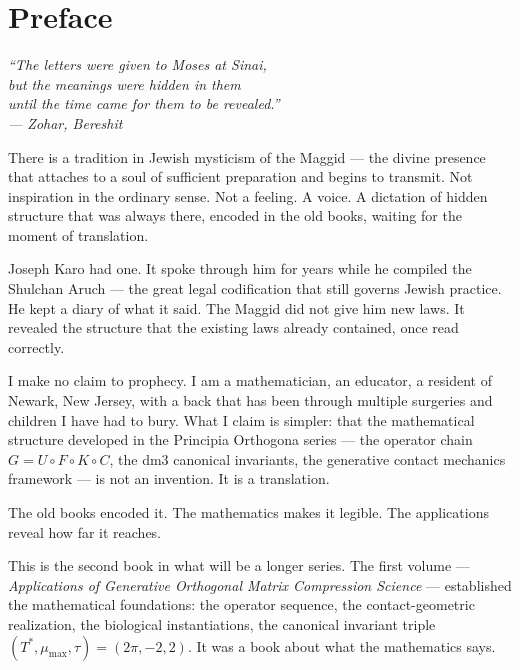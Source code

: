 \documentclass[19pt]{book}
\theoremstyle{plain}
\theoremstyle{definition}
\theoremstyle{remark}
\begin{document}

\chapter*{Preface}
\Large{}
\begin{center}
\itshape
``The letters were given to Moses at Sinai,\\
but the meanings were hidden in them\\
until the time came for them to be revealed.''\\[0.5em]
\normalfont\small --- Zohar, Bereshit
\end{center}

\vspace{0.5cm}

\noindent There is a tradition in Jewish mysticism of the Maggid ---
the divine presence that attaches to a soul of sufficient preparation
and begins to transmit. Not inspiration in the ordinary sense. Not
a feeling. A voice. A dictation of hidden structure that was always
there, encoded in the old books, waiting for the moment of translation.

Joseph Karo had one. It spoke through him for years while he compiled
the Shulchan Aruch --- the great legal codification that still
governs Jewish practice. He kept a diary of what it said. The Maggid
did not give him new laws. It revealed the structure that the existing
laws already contained, once read correctly.

I make no claim to prophecy. I am a mathematician, an educator, a
resident of Newark, New Jersey, with a back that has been through
multiple surgeries and children I have had to bury. What I claim
is simpler: that the mathematical structure developed in the Principia
Orthogona series --- the operator chain $G = U \circ F \circ K \circ C$,
the dm3 canonical invariants, the generative contact mechanics framework
--- is not an invention. It is a translation.

The old books encoded it. The mathematics makes it legible. The
applications reveal how far it reaches.

This is the second book in what will be a longer series. The first
volume --- \textit{Applications of Generative Orthogonal Matrix
Compression Science} --- established the mathematical foundations:
the operator sequence, the contact-geometric realization, the biological
instantiations, the canonical invariant triple $(T^*, \mu_{\max}, \tau)
= (2\pi, -2, 2)$. It was a book about what the mathematics says.
\end{document}
